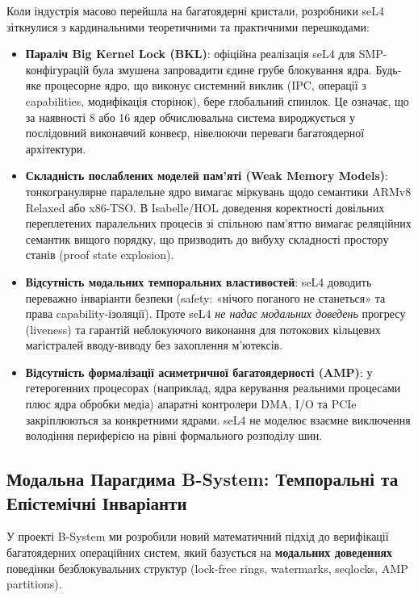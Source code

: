 \documentclass{article}
\begin{document}
Коли індустрія масово перейшла на багатоядерні кристали, розробники seL4 зіткнулися з кардинальними теоретичними та практичними перешкодами:
\begin{itemize}
  \item \textbf{Параліч Big Kernel Lock (BKL)}: офіційна реалізація seL4 для SMP-конфігурацій була змушена запровадити єдине грубе блокування ядра. Будь-яке процесорне ядро, що виконує системний виклик (IPC, операції з capabilities, модифікація сторінок), бере глобальний спинлок. Це означає, що за наявності 8 або 16 ядер обчислювальна система вироджується у послідовний виконавчий конвеєр, нівелюючи переваги багатоядерної архітектури.
  \item \textbf{Складність послаблених моделей пам'яті (Weak Memory Models)}: тонкогранулярне паралельне ядро вимагає міркувань щодо семантики ARMv8 Relaxed або x86-TSO. В Isabelle/HOL доведення коректності довільних переплетених паралельних процесів зі спільною пам'яттю вимагає реляційних семантик вищого порядку, що призводить до вибуху складності простору станів (proof state explosion).
  \item \textbf{Відсутність модальних темпоральних властивостей}: seL4 доводить переважно інваріанти безпеки (safety: «нічого поганого не станеться» та права capability-ізоляції). Проте seL4 \textit{не надає модальних доведень} прогресу (liveness) та гарантій неблокуючого виконання для потокових кільцевих магістралей вводу-виводу без захоплення м'ютексів.
  \item \textbf{Відсутність формалізації асиметричної багатоядерності (AMP)}: у гетерогенних процесорах (наприклад, ядра керування реальними процесами плюс ядра обробки медіа) апаратні контролери DMA, I/O та PCIe закріплюються за конкретними ядрами. seL4 не моделює взаємне виключення володіння периферією на рівні формального розподілу шин.
\end{itemize}

\subsection{Модальна Парагдима B-System: Темпоральні та Епістемічні Інваріанти}

У проекті B-System ми розробили новий математичний підхід до верифікації багатоядерних операційних систем, який базується на \textbf{модальних доведеннях} поведінки безблокувальних структур (lock-free rings, watermarks, seqlocks, AMP partitions).
\end{document}

